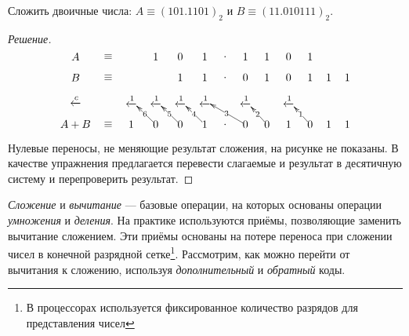 \begin{exampl}[Задача]
    Сложить двоичные числа:
    $A\equiv(101.1101)_2$ и
    $B\equiv(11.010111)_2$.
\end{exampl}
\begin{proof}[Решение]
    \[
        {\entrymodifiers={}
            {\xymatrix@=1pc{
                A&\equiv
                    & &1&0&1&.&1&1&0&1& & \\
                B&\equiv
                    &   &   &1  &1  &.  &0  &1  &0  &1  &1  &1\\
                \xleftarrow{c}             
                &  
                    &\xleftarrow{1}
                        &\xleftarrow{1}
                            &\xleftarrow{1}
                                &\xleftarrow{1}
                                    & 
                                        &\xleftarrow{1}
                                            & 
                                                &\xleftarrow{1}
                                                    & 
                                                        & 
                                                            & \\                    
                A+B
                &\equiv
                    &1
                        &0\ar[ul]|-{6}
                            &0\ar[ul]|-{5}
                                &1\ar[ul]|-{4}
                                    &.
                                        &0\ar[ull]|-{3}
                                            &0\ar[ul]|-{2}
                                                &1
                                                    &0\ar[ul]|-{1}
                                                        &1
                                                            &1
            }}
        }
    \]
    
    Нулевые переносы, не меняющие результат сложения, на рисунке не показаны. В качестве упражнения предлагается перевести слагаемые и результат в десятичную систему и перепроверить результат.
\end{proof}

\emph{Сложение} и \emph{вычитание} --- базовые операции, на которых основаны операции \emph{умножения} и \emph{деления}. На практике используются приёмы, позволяющие заменить вычитание сложением. Эти приёмы основаны на потере переноса при сложении чисел в конечной разрядной сетке\footnote{В процессорах используется фиксированное количество разрядов для представления чисел}. Рассмотрим, как можно перейти от вычитания к сложению, используя \emph{дополнительный} и \emph{обратный} коды.

